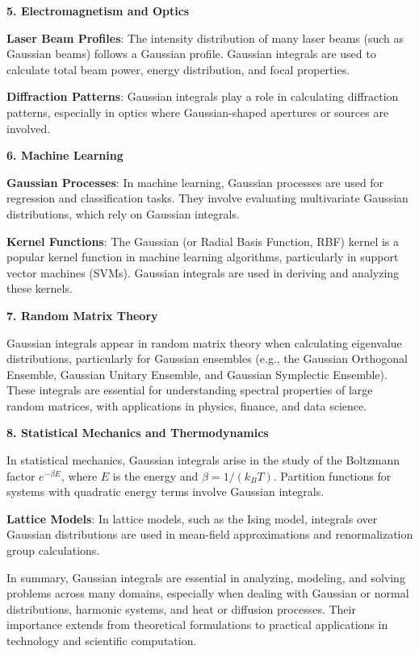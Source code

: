 \documentclass[a4paper,12pt]{book}
\begin{document}
\textbf{5. Electromagnetism and Optics}

\textbf{Laser Beam Profiles}: The intensity distribution of many laser beams (such as Gaussian beams) follows a Gaussian profile. Gaussian integrals are used to calculate total beam power, energy distribution, and focal properties.

\textbf{Diffraction Patterns}: Gaussian integrals play a role in calculating diffraction patterns, especially in optics where Gaussian-shaped apertures or sources are involved.

\textbf{6. Machine Learning}

\textbf{Gaussian Processes}: In machine learning, Gaussian processes are used for regression and classification tasks. They involve evaluating multivariate Gaussian distributions, which rely on Gaussian integrals.

\textbf{Kernel Functions}: The Gaussian (or Radial Basis Function, RBF) kernel is a popular kernel function in machine learning algorithms, particularly in support vector machines (SVMs). Gaussian integrals are used in deriving and analyzing these kernels.

\textbf{7. Random Matrix Theory}

Gaussian integrals appear in random matrix theory when calculating eigenvalue distributions, particularly for Gaussian ensembles (e.g., the Gaussian Orthogonal Ensemble, Gaussian Unitary Ensemble, and Gaussian Symplectic Ensemble). These integrals are essential for understanding spectral properties of large random matrices, with applications in physics, finance, and data science.

\textbf{8. Statistical Mechanics and Thermodynamics}

In statistical mechanics, Gaussian integrals arise in the study of the Boltzmann factor \(e^{-\beta E}\), where \(E\) is the energy and \(\beta = 1/(k_B T)\). Partition functions for systems with quadratic energy terms involve Gaussian integrals.

\textbf{Lattice Models}: In lattice models, such as the Ising model, integrals over Gaussian distributions are used in mean-field approximations and renormalization group calculations.

In summary, Gaussian integrals are essential in analyzing, modeling, and solving problems across many domains, especially when dealing with Gaussian or normal distributions, harmonic systems, and heat or diffusion processes. Their importance extends from theoretical formulations to practical applications in technology and scientific computation.
\end{document}
